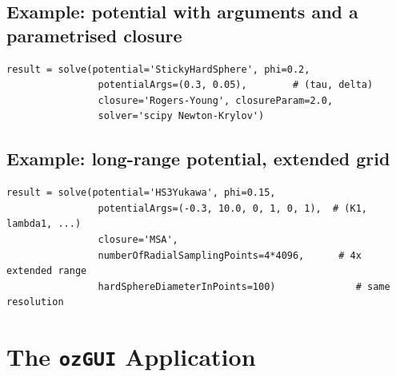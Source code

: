 \documentclass[11pt,a4paper]{article}
\newcommand{\code}[1]{\texttt{#1}}
\begin{document}
\subsection{Example: potential with arguments and a parametrised closure}
\begin{lstlisting}
result = solve(potential='StickyHardSphere', phi=0.2,
                potentialArgs=(0.3, 0.05),        # (tau, delta)
                closure='Rogers-Young', closureParam=2.0,
                solver='scipy Newton-Krylov')
\end{lstlisting}

\subsection{Example: long-range potential, extended grid}
\begin{lstlisting}
result = solve(potential='HS3Yukawa', phi=0.15,
                potentialArgs=(-0.3, 10.0, 0, 1, 0, 1),  # (K1, lambda1, ...)
                closure='MSA',
                numberOfRadialSamplingPoints=4*4096,      # 4x extended range
                hardSphereDiameterInPoints=100)              # same resolution
\end{lstlisting}

\section{The \code{ozGUI} Application}
\label{sec:gui}
\end{document}
